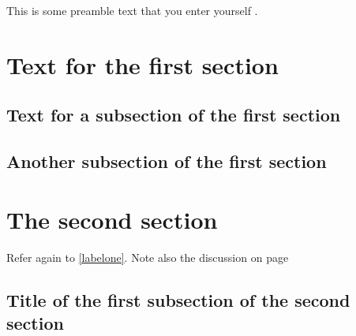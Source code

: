 \documentclass{article}
\begin{document}
This is some preamble text that you enter yourself .
%
\section { Text for the first section }
\lipsum [1]

\subsection { Text for a subsection of the first section }
\lipsum [2 -3]
\label{labelone}

\subsection { Another subsection of the first section }
\lipsum [4 -5]
\label{labeltwo}

\section { The second section }
\lipsum [6]

Refer again to \ref{labelone}.
Note also the discussion on page \pageref{labeltwo}

\subsection { Title of the first subsection of the second section }

\lipsum [7]
\end{document}
